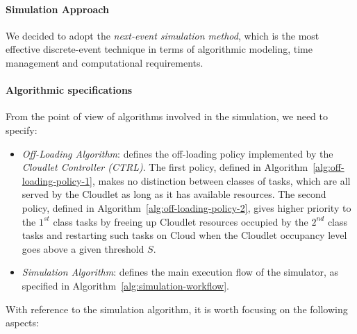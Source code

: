 \paragraph{Simulation Approach}
We decided to adopt the \textit{next-event simulation method}, which is the most effective discrete-event technique in terms of algorithmic modeling, time management and computational requirements.

\paragraph{Algorithmic specifications}
From the point of view of algorithms involved in the simulation, we need to specify:

\begin{itemize}
	
	\item \textit{Off-Loading Algorithm}: defines the off-loading policy implemented by the \textit{Cloudlet Controller (CTRL)}. 
	The first policy, defined in Algorithm~\ref{alg:off-loading-policy-1}, makes no distinction between classes of tasks, which are all served by the Cloudlet as long as it has available resources. 
	The second policy, defined in Algorithm~\ref{alg:off-loading-policy-2}, gives higher priority to the $1^{st}$ class tasks by freeing up Cloudlet resources occupied by the $2^{nd}$ class tasks and restarting such tasks on Cloud when the Cloudlet occupancy level goes above a given threshold $S$.
	
	\item \textit{Simulation Algorithm}: defines the main execution flow of the simulator, as specified in Algorithm~\ref{alg:simulation-workflow}.
\end{itemize}

With reference to the simulation algorithm, it is worth focusing on the following aspects:

